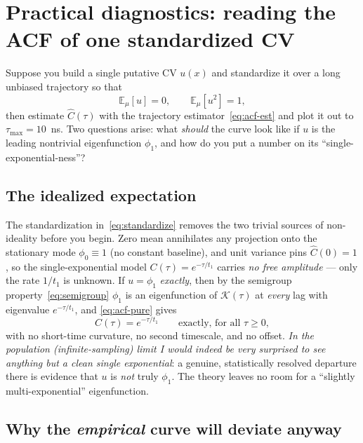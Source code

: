 \documentclass[11pt]{article}
\theoremstyle{plain}
\theoremstyle{definition}
\newcommand{\Kop}{\mathcal{K}}
\newcommand{\E}{\mathbb{E}}
\begin{document}
\section{Practical diagnostics: reading the ACF of one standardized CV}
\label{sec:practical}

Suppose you build a single putative CV $u(x)$ and standardize it over a long
unbiased trajectory so that
\begin{equation}
\E_\mu[u]=0,\qquad \E_\mu[u^2]=1 ,
\label{eq:standardize}
\end{equation}
then estimate $\widehat C(\tau)$ with the trajectory estimator~\eqref{eq:acf-est}
and plot it out to $\tau_{\max}=10$~ns. Two questions arise: what \emph{should} the
curve look like if $u$ is the leading nontrivial eigenfunction $\phi_1$, and how do
you put a number on its ``single-exponential-ness''?

\subsection{The idealized expectation}

The standardization in~\eqref{eq:standardize} removes the two trivial sources of
non-ideality before you begin. Zero mean annihilates any projection onto the
stationary mode $\phi_0\equiv1$ (no constant baseline), and unit variance pins
$\widehat C(0)=1$, so the single-exponential model $C(\tau)=e^{-\tau/t_1}$ carries
\emph{no free amplitude} --- only the rate $1/t_1$ is unknown. If $u=\phi_1$
\emph{exactly}, then by the semigroup property~\eqref{eq:semigroup} $\phi_1$ is an
eigenfunction of $\Kop(\tau)$ at \emph{every} lag with eigenvalue $e^{-\tau/t_1}$, and
\eqref{eq:acf-pure} gives
\begin{equation}
C(\tau)=e^{-\tau/t_1}\qquad\text{exactly, for all }\tau\ge0 ,
\end{equation}
with no short-time curvature, no second timescale, and no offset. \emph{In the
population (infinite-sampling) limit I would indeed be very surprised to see anything
but a clean single exponential}: a genuine, statistically resolved departure there
is evidence that $u$ is \emph{not} truly $\phi_1$. The theory leaves no room for a
``slightly multi-exponential'' eigenfunction.

\subsection{Why the \emph{empirical} curve will deviate anyway}
\end{document}
